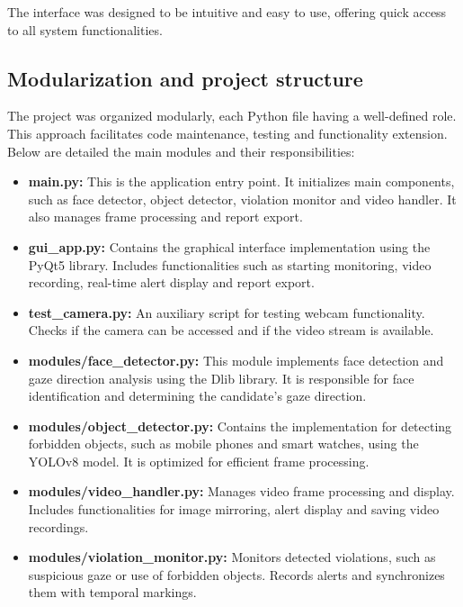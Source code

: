 \documentclass[12pt,a4paper]{article}
\begin{document}
The interface was designed to be intuitive and easy to use, offering quick access to all system functionalities.

\subsection{Modularization and project structure}

\hspace{6mm}The project was organized modularly, each Python file having a well-defined role. This approach facilitates code maintenance, testing and functionality extension. Below are detailed the main modules and their responsibilities:

\begin{itemize}
    \item \textbf{main.py:} This is the application entry point. It initializes main components, such as face detector, object detector, violation monitor and video handler. It also manages frame processing and report export.

    \item \textbf{gui\_app.py:} Contains the graphical interface implementation using the PyQt5 library. Includes functionalities such as starting monitoring, video recording, real-time alert display and report export.
    
    \item \textbf{test\_camera.py:} An auxiliary script for testing webcam functionality. Checks if the camera can be accessed and if the video stream is available.

    \item \textbf{modules/face\_detector.py:} This module implements face detection and gaze direction analysis using the Dlib library. It is responsible for face identification and determining the candidate's gaze direction.

    \item \textbf{modules/object\_detector.py:} Contains the implementation for detecting forbidden objects, such as mobile phones and smart watches, using the YOLOv8 model. It is optimized for efficient frame processing.

    \item \textbf{modules/video\_handler.py:} Manages video frame processing and display. Includes functionalities for image mirroring, alert display and saving video recordings.

    \item \textbf{modules/violation\_monitor.py:} Monitors detected violations, such as suspicious gaze or use of forbidden objects. Records alerts and synchronizes them with temporal markings.


\end{itemize}
\end{document}
